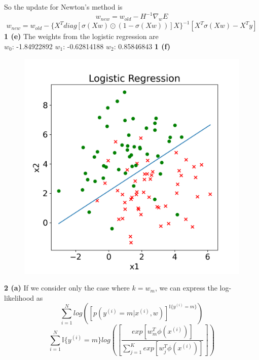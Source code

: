 \documentclass[12 pt]{article}        	%
\begin{document}
So the update for Newton's method is
\[
  w_{new} = w_{old} - H^{-1} \nabla_w E 
\]
\[
  w_{new} = w_{old} - \{X^T diag[ \sigma(Xw) \odot (1 - \sigma(Xw)) ] X \}^{-1} [ X^T \sigma(Xw) - X^T y ]
\]
\textbf{1 (e)} The weights from the logistic regression are \\ 
$ w_0 $: -1.84922892 $ w_1 $: -0.62814188 $ w_2 $: 0.85846843
\newpage
\textbf{1 (f)}
\begin{figure}[h!]
  \includegraphics[width=\linewidth]{logistic_regression.png}
\end{figure}
\newpage
\textbf{2 (a)} If we consider only the case where $ k = w_m $, we can express the log-likelihood as
\[
  \sum_{i=1}^{N} log([p(y^{(i)} = m | x^{(i)}, w)]^{\mathbb{I} \{ y^{(i)} = m \}})
\]
\[
  \sum_{i=1}^{N} \mathbb{I} \{ y^{(i)} = m \} log( [ \frac{
    exp[ w_{m}^{T} \phi(x^{(i)}) ]
  }{
    \sum_{j=1}^{K} exp[ w_{j}^{T} \phi(x^{(i)}) ]
  } ] )
\]
\end{document}
